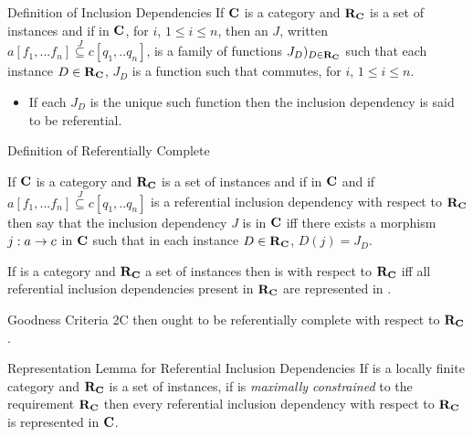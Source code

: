 \begin{frame}{Definition of Inclusion Dependencies}
If $\textbf{C}$ is a category and $\textbf{R}_{\textbf{C}}$ is a set of instances 
and if
\incdsetup
in $\textbf{C}$, for $i$, $1 \leq i \leq n$, then an  $J$, written $a[f_1,...f_n] \overset{J}{\subseteq} c[q_1,..q_n]$, is a family of functions $J_D)_{D \in \textbf{R}_{\textbf{C}}}$
such that each instance $D \in \textbf{R}_{\textbf{C}}$, $J_D$ is a function 
 such that
 \incdresolution commutes, for $i$, $1 \leq i \leq n$. \\

\medskip
\begin{itemize}
\item If each $J_D$ is the unique such function then the inclusion dependency is said to be referential. 
\end{itemize}
\end{frame}

\begin{frame}{Definition of Referentially Complete}
\begin{definition}
If $\textbf{C}$ is a category and $\textbf{R}_{\textbf{C}}$ is a set of instances and if
\fnsourceqnsource
in $\textbf{C}$ and if $a[f_1,...f_n] \overset{J}{\subseteq} c[q_1,..q_n]$ is a referential inclusion dependency
with respect  to $\textbf{R}_{\textbf{C}}$ then say that the inclusion dependency $J$ is  in $\textbf{C}$
iff there exists a morphism $j:a \rightarrow c$ in $\textbf{C}$ such that in each instance $D \in \textbf{R}_{\textbf{C}}$, $D(j) = J_D$. 
\end{definition}
If \catcw is a category and $\textbf{R}_{\textbf{C}}$ a set of instances then 
\catcw is  with respect to $\textbf{R}_{\textbf{C}}$ 
iff all referential inclusion dependencies present in $\textbf{R}_{\textbf{C}}$ are represented in \catc.
\end{frame}

\begin{frame}{Goodness Criteria 2C}
 \IfSforCwithRCwords 
then \catcw ought to be referentially complete with respect to $\textbf{R}_{\textbf{C}}$.
\end{frame}

\begin{frame}{Representation Lemma for Referential Inclusion Dependencies}
If \catcw is a locally finite category and $\textbf{R}_{\textbf{C}}$ is a set of instances, if \catcw is 
\textit{maximally constrained} to the requirement $\textbf{R}_{\textbf{C}}$ then
every referential inclusion dependency with respect to $\textbf{R}_{\textbf{C}}$ is represented in $\textbf{C}$.
\end{frame}

